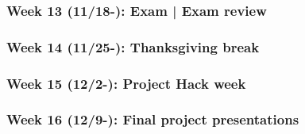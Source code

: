 \documentclass[11pt,article,oneside]{memoir} %
\begin{document}
\subsubsection{Week 13 (11/18-): Exam | Exam review} %
\subsubsection{Week 14 (11/25-): Thanksgiving break} %
\subsubsection{Week 15 (12/2-): Project Hack week}%
\subsubsection{Week 16 (12/9-): Final project presentations}%


\end{document}
